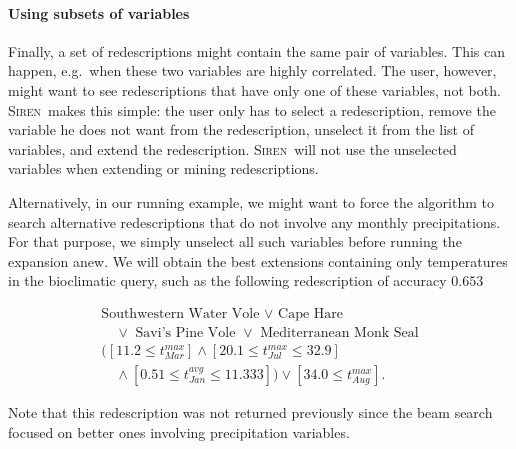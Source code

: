 \documentclass{sig-alternate}
\newcommand{\prg}[1]{\paragraph{#1}}
\newcommand{\Siren}{\textsc{Siren}}
\begin{document}
\prg{Using subsets of variables}
Finally, a set of redescriptions might contain the same pair of
variables. This can happen, e.g.\ when these two variables are highly
correlated. The user, however, might want to see redescriptions that have
only one of these variables, not both. \Siren\ makes this simple: the user
only has to select a redescription, remove the variable he does not
want from the redescription, unselect it from the list of variables, and
extend the redescription. \Siren\ will not use the unselected
variables when extending or mining redescriptions.

Alternatively, in our running example, we might want to force
the algorithm to search alternative redescriptions that do not involve
any monthly precipitations. For that purpose, we simply unselect all such
variables before running the expansion anew. We will obtain the best
extensions containing only temperatures in the bioclimatic query, such as the following redescription of accuracy $0.653$

\begin{equation*}
\begin{array}{l}
\text{Southwestern Water Vole }\lor\text{ Cape Hare }\\[1mm]
\quad\lor\text{ Savi's Pine Vole }\lor\text{ Mediterranean Monk Seal}\\[3mm]
( [11.2 \leq t_{Mar}^{max}] \land  [20.1 \leq t_{Jul}^{max} \leq 32.9]\\[1mm] 
\quad\land  [0.51 \leq t_{Jan}^{avg} \leq 11.333]) \lor  [34.0 \leq t_{Aug}^{max}].
\end{array}
\end{equation*}

Note that this redescription was not returned previously since the
beam search focused on better ones involving precipitation variables.


\end{document}

